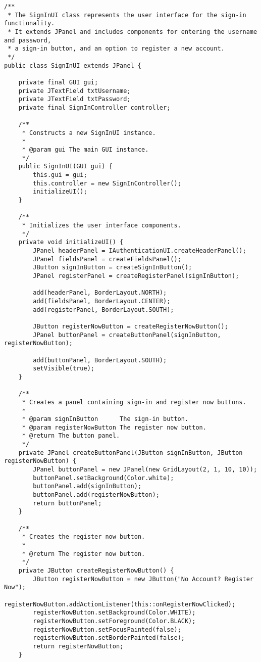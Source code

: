 \begin{lstlisting}[style=JavaStyle, caption={SignInUI Class}, label={lst:signin:snippet}]
/**
 * The SignInUI class represents the user interface for the sign-in functionality.
 * It extends JPanel and includes components for entering the username and password,
 * a sign-in button, and an option to register a new account.
 */
public class SignInUI extends JPanel {

    private final GUI gui;
    private JTextField txtUsername;
    private JTextField txtPassword;
    private final SignInController controller;

    /**
     * Constructs a new SignInUI instance.
     *
     * @param gui The main GUI instance.
     */
    public SignInUI(GUI gui) {
        this.gui = gui;
        this.controller = new SignInController();
        initializeUI();
    }

    /**
     * Initializes the user interface components.
     */
    private void initializeUI() {
        JPanel headerPanel = IAuthenticationUI.createHeaderPanel();
        JPanel fieldsPanel = createFieldsPanel();
        JButton signInButton = createSignInButton();
        JPanel registerPanel = createRegisterPanel(signInButton);

        add(headerPanel, BorderLayout.NORTH);
        add(fieldsPanel, BorderLayout.CENTER);
        add(registerPanel, BorderLayout.SOUTH);

        JButton registerNowButton = createRegisterNowButton();
        JPanel buttonPanel = createButtonPanel(signInButton, registerNowButton);

        add(buttonPanel, BorderLayout.SOUTH);
        setVisible(true);
    }

    /**
     * Creates a panel containing sign-in and register now buttons.
     *
     * @param signInButton      The sign-in button.
     * @param registerNowButton The register now button.
     * @return The button panel.
     */
    private JPanel createButtonPanel(JButton signInButton, JButton registerNowButton) {
        JPanel buttonPanel = new JPanel(new GridLayout(2, 1, 10, 10));
        buttonPanel.setBackground(Color.white);
        buttonPanel.add(signInButton);
        buttonPanel.add(registerNowButton);
        return buttonPanel;
    }

    /**
     * Creates the register now button.
     *
     * @return The register now button.
     */
    private JButton createRegisterNowButton() {
        JButton registerNowButton = new JButton("No Account? Register Now");
        registerNowButton.addActionListener(this::onRegisterNowClicked);
        registerNowButton.setBackground(Color.WHITE);
        registerNowButton.setForeground(Color.BLACK);
        registerNowButton.setFocusPainted(false);
        registerNowButton.setBorderPainted(false);
        return registerNowButton;
    }


\end{lstlisting}
